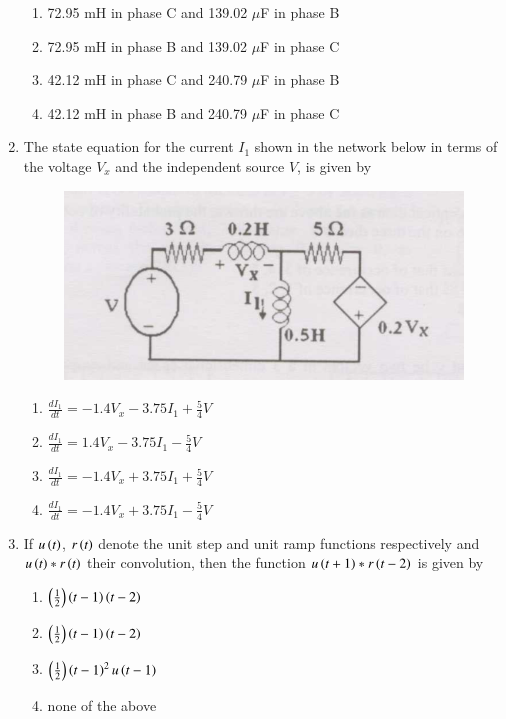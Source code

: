 \documentclass[journal]{IEEEtran}
\begin{document}
\begin{enumerate}
\begin{enumerate}
    \item 72.95 mH in phase C and 139.02 $\mu$F in phase B
    \item 72.95 mH in phase B and 139.02 $\mu$F in phase C
    \item 42.12 mH in phase C and 240.79 $\mu$F in phase B
    \item 42.12 mH in phase B and 240.79 $\mu$F in phase C \\
\end{enumerate}
\item The state equation for the current $I_1$ shown in the network below in terms of the voltage $V_x$ and the independent source $V$, is given by
\begin{figure}[h!]
	    \centering
	    \includegraphics[width=0.7\linewidth]{figs/Q16.png}
     \end{figure}
\begin{enumerate}
    \item $\frac{dI_1}{dt} = -1.4V_x - 3.75I_1 + \frac{5}{4}V$
    \item $\frac{dI_1}{dt} = 1.4V_x - 3.75I_1 - \frac{5}{4}V$
    \item $\frac{dI_1}{dt} = -1.4V_x + 3.75I_1 + \frac{5}{4}V$
    \item $\frac{dI_1}{dt} = -1.4V_x + 3.75I_1 - \frac{5}{4}V$ \\
\end{enumerate}
\item If $u\left(t\right)$, $r\left(t\right)$ denote the unit step and unit ramp functions respectively and $u\left(t\right)*r\left(t\right)$ their convolution, then the function $u\left(t+1\right)*r\left(t-2\right)$ is given by
\begin{enumerate}
    \item $\left(\frac{1}{2}\right)\left(t-1\right)\left(t-2\right)$
    \item $\left(\frac{1}{2}\right)\left(t-1\right)\left(t-2\right)$
    \item $\left(\frac{1}{2}\right)\left(t-1\right)^2u\left(t-1\right)$
    \item none of the above \\
\end{enumerate}
			 \end{enumerate}
			 
\end{document}
